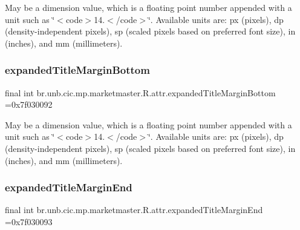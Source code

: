 May be a dimension value, which is a floating point number appended with a unit such as \char`\"{}$<$code$>$14.\+5sp$<$/code$>$\char`\"{}. Available units are\+: px (pixels), dp (density-\/independent pixels), sp (scaled pixels based on preferred font size), in (inches), and mm (millimeters). \mbox{\label{classbr_1_1unb_1_1cic_1_1mp_1_1marketmaster_1_1R_1_1attr_ae54af90bfaec791effe9be75efbf23aa}} 
\subsubsection{\texorpdfstring{expanded\+Title\+Margin\+Bottom}{expandedTitleMarginBottom}}
{\footnotesize\ttfamily final int br.\+unb.\+cic.\+mp.\+marketmaster.\+R.\+attr.\+expanded\+Title\+Margin\+Bottom =0x7f030092\hspace{0.3cm}{\ttfamily [static]}}

May be a dimension value, which is a floating point number appended with a unit such as \char`\"{}$<$code$>$14.\+5sp$<$/code$>$\char`\"{}. Available units are\+: px (pixels), dp (density-\/independent pixels), sp (scaled pixels based on preferred font size), in (inches), and mm (millimeters). \mbox{\label{classbr_1_1unb_1_1cic_1_1mp_1_1marketmaster_1_1R_1_1attr_a9ef0b50602dbfe6692a7568bf7090fb1}} 
\subsubsection{\texorpdfstring{expanded\+Title\+Margin\+End}{expandedTitleMarginEnd}}
{\footnotesize\ttfamily final int br.\+unb.\+cic.\+mp.\+marketmaster.\+R.\+attr.\+expanded\+Title\+Margin\+End =0x7f030093\hspace{0.3cm}{\ttfamily [static]}}

